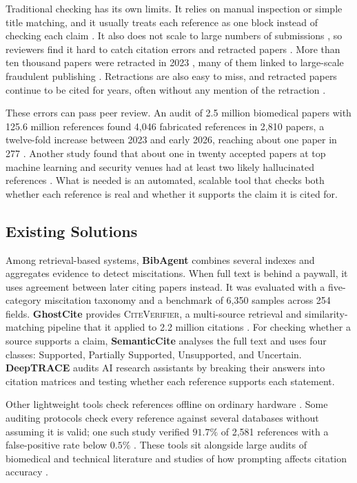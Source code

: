 \documentclass{article}
\begin{document}
Traditional checking has its own limits. It relies on manual inspection or simple title matching, and it usually treats each reference as one block instead of checking each claim \cite{ref1,ref2}. It also does not scale to large numbers of submissions \cite{aczel2021}, so reviewers find it hard to catch citation errors and retracted papers \cite{ref4}. More than ten thousand papers were retracted in 2023 \cite{vannoorden2023,brainard2018}, many of them linked to large-scale fraudulent publishing \cite{else2021,cabanac2021prev,byrne2017}. Retractions are also easy to miss, and retracted papers continue to be cited for years, often without any mention of the retraction \cite{hsiao2021,barilan2017,wager2011}.

These errors can pass peer review. An audit of 2.5 million biomedical papers with 125.6 million references found 4{,}046 fabricated references in 2{,}810 papers, a twelve-fold increase between 2023 and early 2026, reaching about one paper in 277 \cite{ref5}. Another study found that about one in twenty accepted papers at top machine learning and security venues had at least two likely hallucinated references \cite{ref6}. What is needed is an automated, scalable tool that checks both whether each reference is real and whether it supports the claim it is cited for.

\subsection{Existing Solutions}
\label{sec:related}

Among retrieval-based systems, \textbf{BibAgent} \cite{ref1} combines several indexes and aggregates evidence to detect miscitations. When full text is behind a paywall, it uses agreement between later citing papers instead. It was evaluated with a five-category miscitation taxonomy and a benchmark of 6{,}350 samples across 254 fields. \textbf{GhostCite} provides \textsc{CiteVerifier}, a multi-source retrieval and similarity-matching pipeline that it applied to 2.2 million citations \cite{ref9}. For checking whether a source supports a claim, \textbf{SemanticCite} \cite{ref2} analyses the full text and uses four classes: Supported, Partially Supported, Unsupported, and Uncertain. \textbf{DeepTRACE} \cite{ref8} audits AI research assistants by breaking their answers into citation matrices and testing whether each reference supports each statement.

Other lightweight tools check references offline on ordinary hardware \cite{ref3}. Some auditing protocols check every reference against several databases without assuming it is valid; one such study verified $91.7\%$ of 2{,}581 references with a false-positive rate below $0.5\%$ \cite{ref4}. These tools sit alongside large audits of biomedical \cite{ref5} and technical \cite{ref6} literature and studies of how prompting affects citation accuracy \cite{ref10}.
\end{document}
